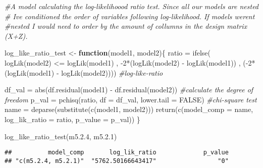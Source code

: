 \documentclass[
]{article}
\newenvironment{Shaded}{\begin{snugshade}}{\end{snugshade}}
\newcommand{\AttributeTok}[1]{\textcolor[rgb]{0.77,0.63,0.00}{#1}}
\newcommand{\CommentTok}[1]{\textcolor[rgb]{0.56,0.35,0.01}{\textit{#1}}}
\newcommand{\ConstantTok}[1]{\textcolor[rgb]{0.00,0.00,0.00}{#1}}
\newcommand{\ControlFlowTok}[1]{\textcolor[rgb]{0.13,0.29,0.53}{\textbf{#1}}}
\newcommand{\DecValTok}[1]{\textcolor[rgb]{0.00,0.00,0.81}{#1}}
\newcommand{\FloatTok}[1]{\textcolor[rgb]{0.00,0.00,0.81}{#1}}
\newcommand{\FunctionTok}[1]{\textcolor[rgb]{0.00,0.00,0.00}{#1}}
\newcommand{\NormalTok}[1]{#1}
\newcommand{\OtherTok}[1]{\textcolor[rgb]{0.56,0.35,0.01}{#1}}
\newcommand{\SpecialCharTok}[1]{\textcolor[rgb]{0.00,0.00,0.00}{#1}}
\begin{document}
\begin{Shaded}
\begin{Highlighting}[]
\CommentTok{\#A model calculating the log{-}likelihoood ratio test. Since all our models are nested}
\CommentTok{\# I\textquotesingle{}ve conditioned the order of variables following log{-}likelihood. If models weren\textquotesingle{}t}
\CommentTok{\#nested I would need to order by the amount of collumns in the design matrix (X+Z).}

\NormalTok{log\_like\_ratio\_test }\OtherTok{\textless{}{-}} \ControlFlowTok{function}\NormalTok{(model1, model2)\{}
\NormalTok{  ratio }\OtherTok{=} \FunctionTok{ifelse}\NormalTok{( }\FunctionTok{logLik}\NormalTok{(model2) }\SpecialCharTok{\textless{}=} \FunctionTok{logLik}\NormalTok{(model1) , }\SpecialCharTok{{-}}\DecValTok{2}\SpecialCharTok{*}\NormalTok{(}\FunctionTok{logLik}\NormalTok{(model2) }\SpecialCharTok{{-}} \FunctionTok{logLik}\NormalTok{(model1)) , (}\SpecialCharTok{{-}}\DecValTok{2}\SpecialCharTok{*}\NormalTok{(}\FunctionTok{logLik}\NormalTok{(model1) }\SpecialCharTok{{-}} \FunctionTok{logLik}\NormalTok{(model2)))) }\CommentTok{\#log{-}like{-}ratio}
  
\NormalTok{  df\_val }\OtherTok{=} \FunctionTok{abs}\NormalTok{(}\FunctionTok{df.residual}\NormalTok{(model1) }\SpecialCharTok{{-}} \FunctionTok{df.residual}\NormalTok{(model2)) }\CommentTok{\#calculate the degree of freedom}
\NormalTok{  p\_val }\OtherTok{=} \FunctionTok{pchisq}\NormalTok{(ratio, }\AttributeTok{df =}\NormalTok{ df\_val, }\AttributeTok{lower.tail =} \ConstantTok{FALSE}\NormalTok{) }\CommentTok{\#chi{-}square test}
\NormalTok{  name }\OtherTok{=} \FunctionTok{deparse}\NormalTok{(}\FunctionTok{substitute}\NormalTok{(}\FunctionTok{c}\NormalTok{(model1, model2)))}
  \FunctionTok{return}\NormalTok{(}\FunctionTok{c}\NormalTok{(}\AttributeTok{model\_comp =}\NormalTok{ name, }\AttributeTok{log\_lik\_ratio =}\NormalTok{ ratio, }\AttributeTok{p\_value =}\NormalTok{ p\_val))}
\NormalTok{\}}


\FunctionTok{log\_like\_ratio\_test}\NormalTok{(m5.}\FloatTok{2.4}\NormalTok{, m5.}\FloatTok{2.1}\NormalTok{)}
\end{Highlighting}
\end{Shaded}

\begin{verbatim}
##          model_comp       log_lik_ratio             p_value 
## "c(m5.2.4, m5.2.1)"  "5762.50166643417"                 "0"
\end{verbatim}
\end{document}
